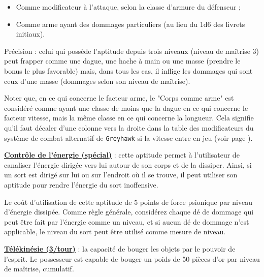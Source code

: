\bigskip

\begin{itemize}
\item Comme modificateur à l'attaque, selon la classe d'armure du défenseur ;
\item Comme arme ayant des dommages particuliers (au lieu du 1d6 des livrets initiaux).
\end{itemize}

\bigskip

Précision : celui qui possède l'aptitude depuis trois niveaux (niveau de maîtrise 3) peut frapper comme une dague, une hache à main ou une masse (prendre le bonus le plus favorable) mais, dans tous les cas, il inflige les dommages qui sont ceux d'une masse (dommages selon son niveau de maîtrise).

\bigskip

Noter que, en ce qui concerne le facteur arme, le "Corps comme arme" est considéré comme ayant une classe de moins que la dague en ce qui concerne le facteur vitesse, mais la même classe en ce qui concerne la longueur. Cela signifie qu'il faut décaler d'une colonne vers la droite dans la table des modificateurs du système de combat alternatif de \texttt{Greyhawk} si la vitesse entre en jeu (voir page \pageref{custom-combat-alternatif}).

\bigskip

\label{guerrier-controle-energie}\textbf{\uline{Contrôle de l'énergie (spécial)}} : cette aptitude permet à l'utilisateur de canaliser l'énergie dirigée vers lui autour de son corps et de la dissiper. Ainsi, si un sort est dirigé sur lui ou sur l'endroit où il se trouve, il peut utiliser son aptitude pour rendre l'énergie du sort inoffensive.

\bigskip

Le coût d'utilisation de cette aptitude de 5 points de force psionique par niveau d'énergie dissipée. Comme règle générale, considérez chaque dé de dommage qui peut être fait par l'énergie comme un niveau, et si aucun dé de dommage n'est applicable, le niveau du sort peut être utilisé comme mesure de niveau.

\bigskip

\label{guerrier-telekinesie}\textbf{\uline{Télékinésie (3/tour)}} : la capacité de bouger les objets par le pouvoir de l'esprit. Le possesseur est capable de bouger un poids de 50 pièces d'or par niveau de maîtrise, cumulatif.

\bigskip


